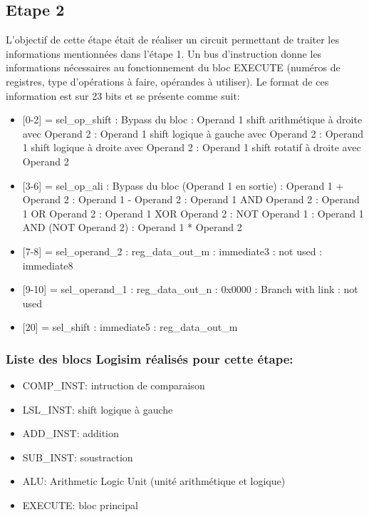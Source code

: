 \documentclass[a4paper]{article} %
\begin{document}
\subsection{Etape 2}
L'objectif de cette étape était de réaliser un circuit permettant de traiter les informations mentionnées dans l'étape 1.
Un bus d'instruction donne les informations nécessaires au fonctionnement du bloc EXECUTE (numéros de registres, type d'opérations à faire, opérandes à utiliser). Le format de ces information est sur 23 bits et se présente comme suit: \medskip \\
\begin{itemize}
\item{[0-2] = sel\_op\_shift}
    : Bypass du bloc
    : Operand 1 shift arithmétique à droite avec Operand 2
    : Operand 1 shift logique à gauche avec Operand 2
    : Operand 1 shift logique à droite avec Operand 2
    : Operand 1 shift rotatif à droite avec Operand 2
\item{[3-6] = sel\_op\_ali}
    : Bypass du bloc (Operand 1 en sortie)
    : Operand 1 + Operand 2
    : Operand 1 - Operand 2
    : Operand 1 AND Operand 2
    : Operand 1 OR Operand 2
    : Operand 1 XOR Operand 2
    : NOT Operand 1
    : Operand 1 AND (NOT Operand 2)
    : Operand 1 * Operand 2
\item{[7-8] = sel\_operand\_2}
    : reg\_data\_out\_m
    : immediate3
    : not used
    : immediate8
\item{[9-10] = sel\_operand\_1}
    : reg\_data\_out\_n
    : 0x0000
    : Branch with link
    : not used
\item{[20] = sel\_shift}
     : immediate5 
     : reg\_data\_out\_m 
\end{itemize}

\subsubsection{Liste des blocs Logisim réalisés pour cette étape:}
\begin{itemize}
    \item COMP\_INST: intruction de comparaison
    \item LSL\_INST: shift logique à gauche
    \item ADD\_INST: addition
    \item SUB\_INST: soustraction
    \item ALU: Arithmetic Logic Unit (unité arithmétique et logique)
    \item EXECUTE: bloc principal

\end{itemize}
\end{document}
